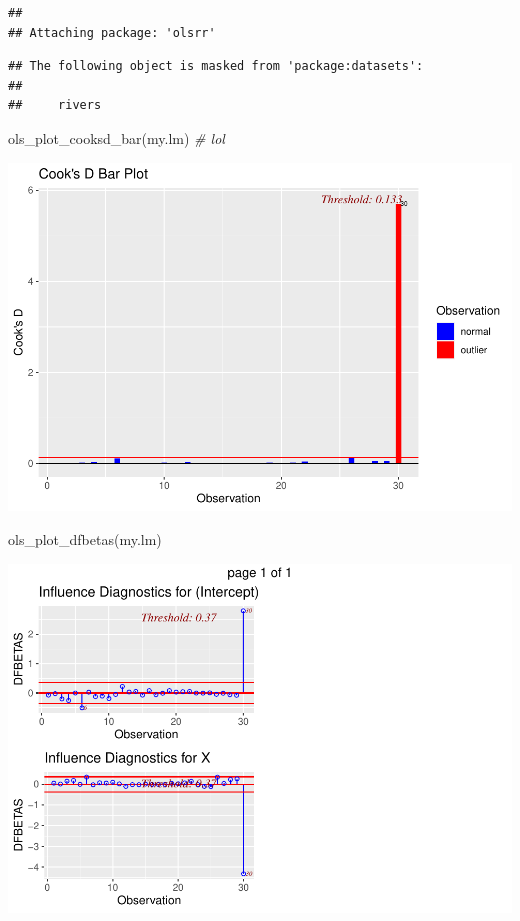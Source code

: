\documentclass[
]{book}
\newenvironment{Shaded}{\begin{snugshade}}{\end{snugshade}}
\newcommand{\CommentTok}[1]{\textcolor[rgb]{0.56,0.35,0.01}{\textit{#1}}}
\newcommand{\FunctionTok}[1]{\textcolor[rgb]{0.00,0.00,0.00}{#1}}
\newcommand{\NormalTok}[1]{#1}
\begin{document}
\begin{verbatim}
## 
## Attaching package: 'olsrr'
\end{verbatim}

\begin{verbatim}
## The following object is masked from 'package:datasets':
## 
##     rivers
\end{verbatim}

\begin{Shaded}
\begin{Highlighting}[]
\FunctionTok{ols\_plot\_cooksd\_bar}\NormalTok{(my.lm)  }\CommentTok{\# lol}
\end{Highlighting}
\end{Shaded}

\includegraphics{13-MultipleLinearRegression_files/figure-latex/unnamed-chunk-19-1.pdf}

\begin{Shaded}
\begin{Highlighting}[]
\FunctionTok{ols\_plot\_dfbetas}\NormalTok{(my.lm)}
\end{Highlighting}
\end{Shaded}

\includegraphics{13-MultipleLinearRegression_files/figure-latex/unnamed-chunk-19-2.pdf}
\end{document}
